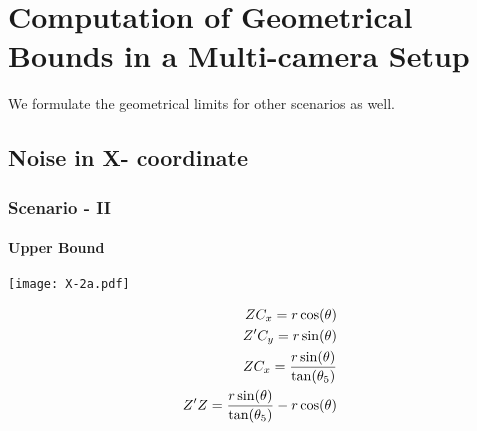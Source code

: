\chapter{Computation of Geometrical Bounds in a Multi-camera Setup} %
\label{append:multicamera} %




We formulate the geometrical limits for other scenarios as well. %

\section{Noise in X- coordinate}
 
\subsection{Scenario - II}

\subsubsection{Upper Bound}

\begin{minipage}[t]{0.5\textwidth}
\texttt{[image: X-2a.pdf]}
\end{minipage}
\begin{minipage}[t]{0.5\textwidth}
\vspace{-2in}
\begin{equation*}
\centering
\begin{aligned}
ZC_x = r\cos(\theta) \\
Z'C_y = r\sin(\theta) \\
ZC_x = \frac{r\sin(\theta)}{\tan(\theta_5)}\\
Z'Z = \frac{r\sin(\theta)}{\tan(\theta_5)} - r\cos(\theta)\\
\end{aligned}
\end{equation*}
\end{minipage}






